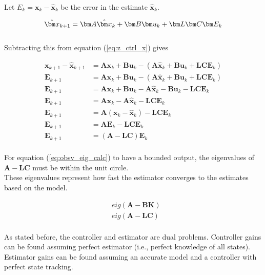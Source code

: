 \documentclass[10pt,conference,compsoc]{IEEEtran}
\newcommand{\mtx}[1] {\bm #1}
\begin{document}
\noindent Let $E_k = \mtx{x}_k - \hat{\mtx{x}}_k$ be the error in the estimate
$\hat{\mtx{x}}_k$.

\begin{equation*}
  \hat{\mtx{x}}_{k+1} = \mtx{A}\hat{\mtx{x}}_k + \mtx{B}\mtx{u}_k +
    \mtx{L}\mtx{C}\mtx{E}_k \\
\end{equation*}
\\
\noindent Subtracting this from equation (\ref{eq:z_ctrl_x}) gives

\begin{align}
  \mtx{x}_{k+1} - \hat{\mtx{x}}_{k+1} &= \mtx{A}\mtx{x}_k + \mtx{B}\mtx{u}_k -
    (\mtx{A}\hat{\mtx{x}}_k + \mtx{B}\mtx{u}_k +
     \mtx{L}\mtx{C}\mtx{E}_k) \nonumber \\
  \mtx{E}_{k+1} &= \mtx{A}\mtx{x}_k + \mtx{B}\mtx{u}_k -
    (\mtx{A}\hat{\mtx{x}}_k + \mtx{B}\mtx{u}_k + \mtx{L}\mtx{C}\mtx{E}_k)
    \nonumber \\
  \mtx{E}_{k+1} &= \mtx{A}\mtx{x}_k + \mtx{B}\mtx{u}_k -
    \mtx{A}\hat{\mtx{x}}_k - \mtx{B}\mtx{u}_k - \mtx{L}\mtx{C}\mtx{E}_k
    \nonumber \\
  \mtx{E}_{k+1} &= \mtx{A}\mtx{x}_k - \mtx{A}\hat{\mtx{x}}_k -
    \mtx{L}\mtx{C}\mtx{E}_k \nonumber \\
  \mtx{E}_{k+1} &= \mtx{A}(\mtx{x}_k - \hat{\mtx{x}}_k) -
    \mtx{L}\mtx{C}\mtx{E}_k \nonumber \\
  \mtx{E}_{k+1} &= \mtx{A}\mtx{E}_k - \mtx{L}\mtx{C}\mtx{E}_k \nonumber \\
  \mtx{E}_{k+1} &= (\mtx{A} - \mtx{L}\mtx{C})\mtx{E}_k \label{eq:obsv_eig_calc}
\end{align}
\\
\noindent For equation (\ref{eq:obsv_eig_calc}) to have a bounded output, the
eigenvalues of $\mtx{A} - \mtx{L}\mtx{C}$ must be within the unit circle. \\

\noindent These eigenvalues represent how fast the estimator converges to the
estimates based on the model.

\begin{align}
  &eig(\mtx{A} - \mtx{B}\mtx{K}) \\
  &eig(\mtx{A} - \mtx{L}\mtx{C}) \\ \nonumber
\end{align}

\noindent As stated before, the controller and estimator are dual problems.
Controller gains can be found assuming perfect estimator (i.e., perfect
knowledge of all \glspl{state}). Estimator gains can be found assuming an
accurate model and a controller with perfect \gls{state tracking}.
\end{document}
